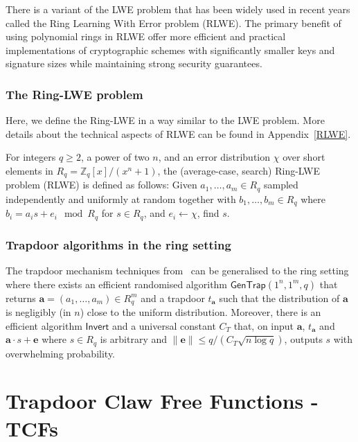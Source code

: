 \documentclass[cryptography,review,submit,pdftex,moreauthors,amsmath,amssymb,aps,strict]{Definitions/mdpi}
\newcommand{\minh}[1]{\textcolor{blue}{#1}}
\begin{document}
There is a variant of the LWE problem that has been widely used in recent years called the Ring Learning With Error problem (RLWE). The primary benefit of using polynomial rings in RLWE offer more efficient and practical implementations of cryptographic schemes with significantly smaller keys and signature sizes while maintaining strong security guarantees.


\subsubsection{The Ring-LWE problem}
Here, we define the Ring-LWE in a way similar to the LWE problem. More details about the technical aspects of RLWE can be found in Appendix~\ref{RLWE}.

For integers $q\geq 2$, a power of two $n$, and an error distribution $\chi$ over short elements in $R_q = \mathbb{Z}_q[x]/(x^n+1)$, the (average-case, search) Ring-LWE problem (RLWE) is defined as follows: 
Given $a_1,\dots, a_{m}\in R_q$ sampled independently and uniformly at random together with $b_1,\dots,b_{m}\in R_q$ where $b_i=a_i s + e_i \mod R_q$ for $s\in R_q$, and $e_i\gets \chi$, find $s$.


\subsubsection{Trapdoor algorithms in the ring setting}

The trapdoor mechanism techniques from~\cite{MP12} can be generalised to the ring setting where there exists an efficient randomised algorithm $\mathsf{GenTrap}(1^n,1^m,q)$ that returns $\mathbf{a}=(a_1,\dots,a_m)\in R^{m}_q$ and a trapdoor $t_{\mathbf{a}}$ such that the distribution of $\mathbf{a}$ is negligibly (in $n$) close to the uniform distribution. Moreover, there is an efficient algorithm $\mathsf{Invert}$ and a universal constant $C_T$ that, on input $\mathbf{a}$, $t_{\mathbf{a}}$ and $\mathbf{a}\cdot s+\mathbf{e}$ where $s \in R_q$ is arbitrary and $\|\mathbf{e}\|\leq q/(C_T\sqrt{n\log q})$, outputs $s$ with overwhelming probability.

\section{Trapdoor Claw Free Functions - TCFs} \label{tfcs}
\end{document}
